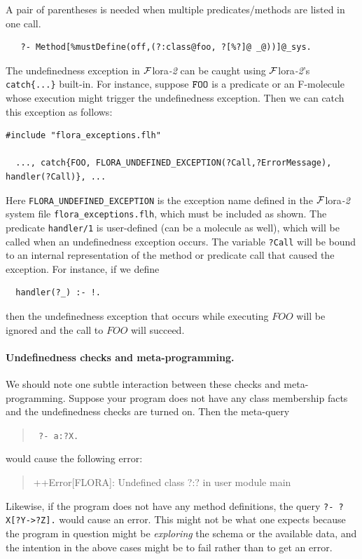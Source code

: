 \documentclass[11pt]{article}
\newcommand{\FLORA}{{\mbox{\sc ${\cal F}${lora}\rm\emph{-2}}}\xspace}
\begin{document}
A pair of parentheses is needed when multiple
predicates/methods are listed in one call.
\begin{verbatim}
   ?- Method[%mustDefine(off,(?:class@foo, ?[%?]@ _@))]@_sys.
\end{verbatim}

The undefinedness exception in \FLORA can be caught using \FLORA's {\tt
  catch\{...\}} built-in. For instance, suppose
$\tt FOO$ is a predicate or an F-molecule whose execution might trigger the
undefinedness exception. Then we can catch this exception as follows:
\begin{verbatim}
#include "flora_exceptions.flh"

  ..., catch{FOO, FLORA_UNDEFINED_EXCEPTION(?Call,?ErrorMessage), handler(?Call)}, ...
\end{verbatim}
Here {\tt FLORA\_UNDEFINED\_EXCEPTION} is the exception name defined in the
\FLORA system file {\tt flora\_exceptions.flh}, which must be included as
shown.
The predicate {\tt handler/1} is user-defined (can be a molecule as well),
which will be called when an undefinedness exception occurs. The variable
{\tt ?Call} will be bound to an internal representation of the method or
predicate call that caused the exception. For instance, if we define
\begin{verbatim}
  handler(?_) :- !.  
\end{verbatim}
then the undefinedness exception that occurs while executing $FOO$ will be
ignored and the call to $FOO$ will succeed.


\paragraph{Undefinedness checks and meta-programming.}
We should note one subtle interaction between these checks and
meta-programming. Suppose your program does not have any class membership
facts and the undefinedness checks are turned on. Then the meta-query
\begin{quote}
 {\tt
       ?- a:?X.
 }
\end{quote}
would cause the following error:
\begin{quote}
 ++Error[FLORA]: Undefined class ?:? in user module main  
\end{quote}
Likewise, if the program does not have any method definitions,
the query {\tt ?- ?X[?Y->?Z].} would cause an error. This might not
be what one expects because the program in question might be
\emph{exploring} the schema or the available data, and the intention in the
above cases might be to fail rather than to get an error.
\end{document}
